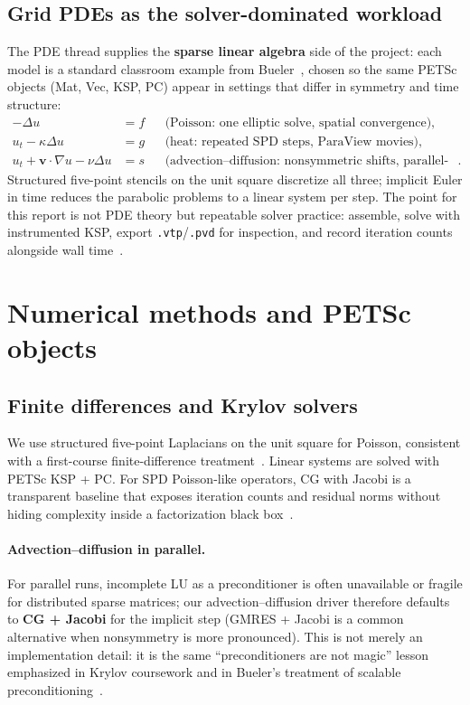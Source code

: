 \documentclass[11pt]{article}
\begin{document}
\subsection{Grid PDEs as the solver-dominated workload}
The PDE thread supplies the \textbf{sparse linear algebra} side of the project:
each model is a standard classroom example from Bueler~\cite{bueler2020petsc}, chosen
so the same PETSc objects (\textsf{Mat}, \textsf{Vec}, \textsf{KSP}, \textsf{PC})
appear in settings that differ in symmetry and time structure:
\begin{align*}
  -\Delta u &= f && \text{(Poisson: one elliptic solve, spatial convergence)},\\
  u_t - \kappa \Delta u &= g && \text{(heat: repeated SPD steps, ParaView movies)},\\
  u_t + \mathbf{v}\!\cdot\!\nabla u - \nu \Delta u &= s &&
  \text{(advection--diffusion: nonsymmetric shifts, parallel-safe PC choices)}.
\end{align*}
Structured five-point stencils on the unit square discretize all three; implicit
Euler in time reduces the parabolic problems to a linear system per step. The
point for this report is not PDE theory but repeatable solver practice:
assemble, solve with instrumented \textsf{KSP}, export \texttt{.vtp}/\texttt{.pvd}
for inspection, and record iteration counts alongside wall time~\cite{bueler2020petsc,petsc-user-ref}.


\section{Numerical methods and PETSc objects}
\subsection{Finite differences and Krylov solvers}
We use structured five-point Laplacians on the unit square for Poisson, consistent
with a first-course finite-difference treatment~\cite{bueler2020petsc}. Linear
systems are solved with PETSc \textsf{KSP} + \textsf{PC}. For SPD Poisson-like
operators, CG with Jacobi is a transparent baseline that exposes iteration counts
and residual norms without hiding complexity inside a factorization black
box~\cite{bueler2020petsc,petsc-user-ref}.

\paragraph{Advection--diffusion in parallel.}
For parallel runs, incomplete LU as a preconditioner is often unavailable or
fragile for distributed sparse matrices; our advection--diffusion driver therefore
defaults to \textbf{CG + Jacobi} for the implicit step (GMRES + Jacobi is a common
alternative when nonsymmetry is more pronounced). This is not merely an
implementation detail: it is the same ``preconditioners are not magic'' lesson
emphasized in Krylov coursework and in Bueler's treatment of scalable
preconditioning~\cite{bueler2020petsc,petsc-user-ref}.
\end{document}
